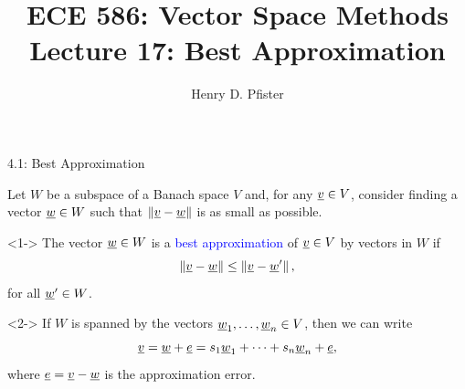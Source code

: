 \documentclass[10pt,english,aspectratio=169]{beamer}
\begin{document}
\title{ECE 586: Vector Space Methods \\ Lecture 17: Best Approximation}
\author{Henry D. Pfister \\ \univ}
\date{}


\begin{frame}[plain]
	\titlepage
	
\end{frame}

\addtocounter{framenumber}{-1}

\begin{frame}{4.1: Best Approximation}

Let $W$ be a subspace of a Banach space $V$ and, for any $\underline{v} \in V$, consider finding a vector $\underline{w} \in W$ such that $\left\| \underline{v} - \underline{w} \right\|$ is as small as possible.
\begin{definition}<1->
The vector $\underline{w} \in W$ is a \textcolor{blue}{best approximation} of $\underline{v} \in V$ by vectors in $W$ if \vspace{-1.5mm}
\begin{equation*}
\left\| \vecnot{v} - \vecnot{w} \right\| \leq \left\| \vecnot{v} - \vecnot{w}' \right\|, \vspace{-2.5mm}
\end{equation*}
for all $\underline{w}' \in W$.
\end{definition}

\begin{example}<2->
If $W$ is spanned by the vectors $\underline{w}_1, \ldots, \underline{w}_n \in V$, then we can write \vspace{-1.5mm}
\begin{equation*}
\vecnot{v} = \vecnot{w} + \vecnot{e} = s_1 \vecnot{w}_1 + \cdots + s_n \vecnot{w}_n + \vecnot{e}, \vspace{-1.5mm}
\end{equation*}
where $\underline{e} = \underline{v}-\underline{w}$ is the approximation error.
\end{example}
\end{frame}
\end{document}
